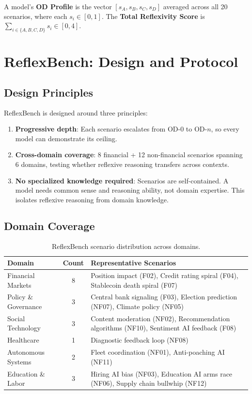 \documentclass{article}
\begin{document}
A model's \textbf{OD Profile} is the vector $[s_{A}, s_{B}, s_{C}, s_{D}]$ averaged across all 20 scenarios, where each $s_i \in [0, 1]$. The \textbf{Total Reflexivity Score} is $\sum_{i \in \{A,B,C,D\}} s_i \in [0, 4]$.

\section{ReflexBench: Design and Protocol}
\label{sec:design}

\subsection{Design Principles}

ReflexBench is designed around three principles:

\begin{enumerate}[leftmargin=*]
\item \textbf{Progressive depth}: Each scenario escalates from OD-0 to OD-$n$, so every model can demonstrate its ceiling.
\item \textbf{Cross-domain coverage}: 8 financial + 12 non-financial scenarios spanning 6 domains, testing whether reflexive reasoning transfers across contexts.
\item \textbf{No specialized knowledge required}: Scenarios are self-contained. A model needs common sense and reasoning ability, not domain expertise. This isolates reflexive reasoning from domain knowledge.
\end{enumerate}

\subsection{Domain Coverage}

\begin{table}[h]
\centering
\caption{ReflexBench scenario distribution across domains.}
\label{tab:domains}
\begin{tabular}{@{}lcp{7cm}@{}}
\toprule
\textbf{Domain} & \textbf{Count} & \textbf{Representative Scenarios} \\
\midrule
Financial Markets & 8 & Position impact (F02), Credit rating spiral (F04), Stablecoin death spiral (F07) \\
Policy \& Governance & 3 & Central bank signaling (F03), Election prediction (NF07), Climate policy (NF05) \\
Social Technology & 3 & Content moderation (NF02), Recommendation algorithms (NF10), Sentiment AI feedback (F08) \\
Healthcare & 1 & Diagnostic feedback loop (NF08) \\
Autonomous Systems & 2 & Fleet coordination (NF01), Anti-poaching AI (NF11) \\
Education \& Labor & 3 & Hiring AI bias (NF03), Education AI arms race (NF06), Supply chain bullwhip (NF12) \\
\bottomrule
\end{tabular}
\end{table}
\end{document}

